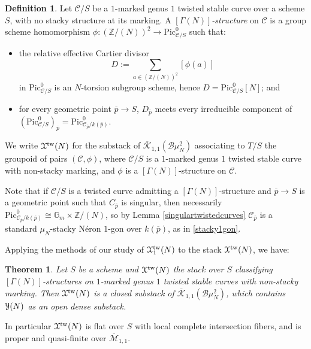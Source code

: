 \documentclass[11pt]{amsart}
\newtheorem{theorem}[subsection]{Theorem}
\theoremstyle{definition}
\newtheorem{definition}[subsection]{Definition}
\begin{document}
\begin{definition}\label{gammaNtwistedcurve}
Let ${\mathcal{C}}/S$ be a $1$-marked genus $1$ twisted stable curve over a scheme $S$, with no stacky structure at its marking. A \textit{$[\Gamma(N)]$-structure} on ${\mathcal{C}}$ is a group scheme homomorphism $\phi: (\mathbb{Z}/(N))^2 \rightarrow \mathrm{Pic}^0_{{\mathcal{C}}/S}$ such that:
\begin{itemize}
  \item the relative effective Cartier divisor 
  \begin{displaymath}
    D := \sum_{a \in (\mathbb{Z}/(N))^2} [\phi(a)]
  \end{displaymath}
  in $\mathrm{Pic}^0_{{\mathcal{C}}/S}$ is an $N$-torsion subgroup scheme, hence $D = \mathrm{Pic}^0_{{\mathcal{C}}/S}[N]$; and 
  \item for every geometric point $\overline{p} \rightarrow S$, $D_{\overline{p}}$ meets every irreducible component of $(\mathrm{Pic}^0_{{\mathcal{C}}/S})_{\overline{p}} = \mathrm{Pic}^0_{{\mathcal{C}}_{\overline{p}}/k(\overline{p})}$.
\end{itemize}
We write ${\mathbf{\EuScript{X}}}^{\mathrm{tw}}(N)$ for the substack of $\overline{\mathcal{K}}_{1,1}({\mathcal{B}}\mu_N^2)$ associating to $T/S$ the groupoid of pairs $({\mathcal{C}},\phi)$, where ${\mathcal{C}}/S$ is a $1$-marked genus $1$ twisted stable curve with non-stacky marking, and $\phi$ is a $[\Gamma(N)]$-structure on ${\mathcal{C}}$.
\end{definition}

Note that if ${\mathcal{C}}/S$ is a twisted curve admitting a $[\Gamma(N)]$-structure and $\overline{p} \rightarrow S$ is a geometric point such that $C_{\overline{p}}$ is singular, then necessarily $\mathrm{Pic}^0_{{\mathcal{C}}_{\overline{p}}/k(\overline{p})} \cong \mathbb{G}_m \times \mathbb{Z}/(N)$, so by Lemma \ref{singulartwistedcurves} ${\mathcal{C}}_{\overline{p}}$ is a standard $\mu_N$-stacky N\'eron $1$-gon over $k(\overline{p})$, as in \ref{stacky1gon}.

Applying the methods of our study of ${\mathbf{\EuScript{X}}}^{\mathrm{tw}}_1(N)$ to the stack ${\mathbf{\EuScript{X}}}^{\mathrm{tw}}(N)$, we have:
\begin{theorem}\label{gamma}
Let $S$ be a scheme and ${\mathbf{\EuScript{X}}}^{\mathrm{tw}}(N)$ the stack over $S$ classifying $[\Gamma(N)]$-structures on $1$-marked genus $1$ twisted stable curves with non-stacky marking. Then ${\mathbf{\EuScript{X}}}^{\mathrm{tw}}(N)$ is a closed substack of $\overline{\mathcal{K}}_{1,1}({\mathcal{B}}\mu_N^2)$, which contains ${\mathbf{\EuScript{Y}}}(N)$ as an open dense substack.
\end{theorem}
In particular ${\mathbf{\EuScript{X}}}^{\mathrm{tw}}(N)$ is flat over $S$ with local complete intersection fibers, and is proper and quasi-finite over $\overline{\mathcal{M}}_{1,1}$.
\end{document}
